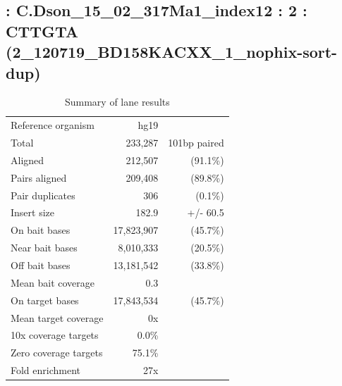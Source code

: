 \documentclass{article}
\begin{document}
    
\subsection*{ : C.Dson\_15\_02\_317Ma1\_index12 : 2 : CTTGTA (2\_120719\_BD158KACXX\_1\_nophix-sort-dup)}

    \begin{table}[h]
    \centering
    \begin{tabular}{|l|rr|}
    \hline
            Reference organism & hg19 &  \\ 
            Total & 233,287 & 101bp paired \\ 
            Aligned & 212,507 & (91.1\%) \\ 
            Pairs aligned & 209,408 & (89.8\%) \\ 
            Pair duplicates & 306 & (0.1\%) \\ 
            Insert size & 182.9 & +/- 60.5 \\ 
            \hline
            On bait bases & 17,823,907 & (45.7\%) \\ 
            Near bait bases & 8,010,333 & (20.5\%) \\ 
            Off bait bases & 13,181,542 & (33.8\%) \\ 
            Mean bait coverage & 0.3 &  \\ 
            On target bases & 17,843,534 & (45.7\%) \\ 
            Mean target coverage & 0x &  \\ 
            10x coverage targets & 0.0\% &  \\ 
            Zero coverage targets & 75.1\% &  \\ 
            Fold enrichment & 27x &  \\ 
    \hline
    \end{tabular}
    \caption{Summary of lane results}
    \end{table}
\end{document}
